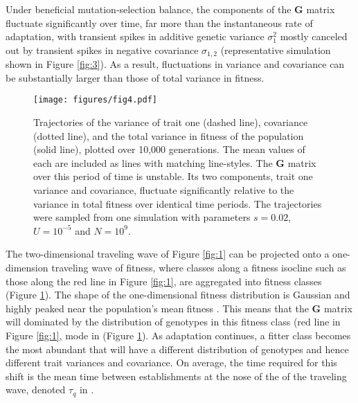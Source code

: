 \documentclass[9pt,twocolumn,twoside]{gsajnl}
\newcommand{\G}{\textbf{G }}
\begin{document}
% 
% 
% 
% 
% 
Under beneficial mutation-selection balance, the components of the \G matrix fluctuate significantly over time, far more than the instantaneous rate of adaptation, with transient spikes in additive genetic variance $\sigma_1^2$ mostly canceled out by transient spikes in negative covariance $\sigma_{1,2}$ (representative simulation shown in Figure \ref{fig:3}). As a result, fluctuations in variance and covariance can be substantially larger than those of total variance in fitness.\par

\begin{figure}[!ht]
\texttt{[image: figures/fig4.pdf]}
% 
% 
\caption{Trajectories of the variance of trait one (dashed line), covariance (dotted line), and the total variance in fitness of the population (solid line), plotted over 10,000 generations. The mean values of each are included as lines with matching line-styles. The \G matrix over this period of time is unstable. Its two components, trait one variance and covariance, fluctuate significantly relative to the variance in total fitness over identical time periods. The trajectories were sampled from one simulation with parameters $s=0.02$, $U=10^{-5}$ and $N=10^9$.}\label{fig:4}
% 
% 
\end{figure}

The two-dimensional traveling wave of Figure \ref{fig:1} can be projected onto a one-dimension traveling wave of fitness, where classes along a fitness isocline such as those along the red line in Figure \ref{fig:1}, are aggregated into fitness classes (Figure \ref{fig:4}). The shape of the one-dimensional fitness distribution is Gaussian and highly peaked near the population's mean fitness \citep{desai2007beneficial}. This means that the \G matrix will dominated by the distribution of genotypes in this fitness class (red line in Figure \ref{fig:1}, mode in (Figure \ref{fig:4}). As adaptation continues, a fitter class becomes the most abundant that will have a different distribution of genotypes and hence different trait variances and covariance. On average, the time required for this shift is the mean time between establishments at the nose of the of the traveling wave, denoted $\tau_q$ in \citet{desai2007beneficial}.
\end{document}
